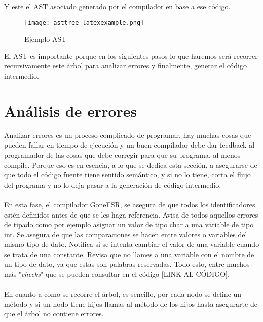 \newpage Y este el AST asociado generado por el compilador en base a ese código.
\begin{figure}[H] %
    \centering
    \texttt{[image: asttree\_latexexample.png]} %
    \parbox{\linewidth}{\centering Ejemplo AST}
    \label{fig:mi_imagen} %
\end{figure}
\newpage
El AST es importante porque en los siguientes pasos lo que haremos será recorrer recursivamente este árbol para analizar errores y finalmente, generar el código intermedio.
\section{Análisis de errores}
Analizar errores es un proceso complicado de programar, hay muchas cosas que pueden fallar en tiempo de ejecución y un buen compilador debe dar feedback al programador de las cosas que debe corregir para que su programa, al menos compile. Porque eso es en esencia, a lo que se dedica esta sección, a asegurarse de que todo el código fuente tiene sentido semántico, y si no lo tiene, corta el flujo del programa y no lo deja pasar a la generación de código intermedio.  \\\\
En esta fase, el compilador GoneFSR, se asegura de que todos los identificadores estén definidos antes de que se les haga referencia. Avisa de todos aquellos errores de tipado como por ejemplo asignar un valor de tipo char a una variable de tipo int. Se asegura de que las comparaciones se hacen entre valores o variables del mismo tipo de dato. Notifica si se intenta cambiar el valor de una variable cuando se trata de una constante. Revisa que no llames a una variable con el nombre de un tipo de dato, ya que estas son palabras reservadas. Todo esto, entre muchos más "\textit{checks}" que se pueden consultar en el código [LINK AL CÓDIGO].
\\\\
En cuanto a como se recorre el árbol, es sencillo, por cada nodo se define un método y si un nodo tiene hijos llamas al método de los hijos hasta asegurarte de que el árbol no contiene errores.\\\\
